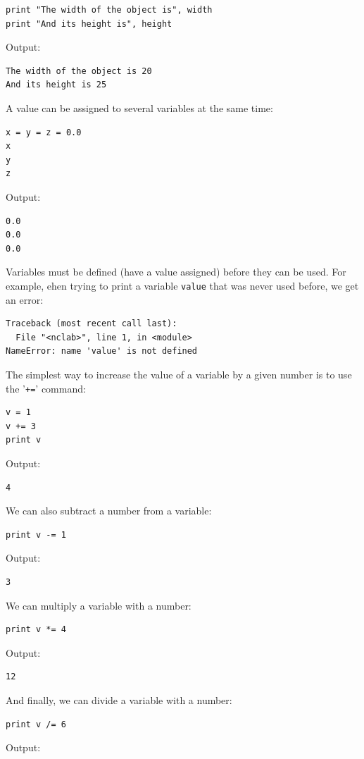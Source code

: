 \documentclass[article,A4,12pt]{llncs}
\begin{document}
\begin{verbatim}
print "The width of the object is", width
print "And its height is", height
\end{verbatim}
Output:

\begin{verbatim}
The width of the object is 20
And its height is 25
\end{verbatim}
A value can be assigned to several variables at the same time:

\begin{verbatim}
x = y = z = 0.0
x
y
z
\end{verbatim}
Output:

\begin{verbatim}
0.0
0.0
0.0
\end{verbatim}
Variables must be defined (have a value assigned) before they can be 
used. For example, ehen trying to print a variable {\tt value} that 
was never used before, we get an error:

\begin{verbatim}
Traceback (most recent call last):
  File "<nclab>", line 1, in <module>
NameError: name 'value' is not defined
\end{verbatim}
The simplest way to increase the value of a variable by a given number is to use the '{\tt +=}' 
command:

\begin{verbatim}
v = 1
v += 3
print v
\end{verbatim}
Output:

\begin{verbatim}
4
\end{verbatim}
We can also subtract a number from a variable:

\begin{verbatim}
print v -= 1
\end{verbatim}
Output:

\begin{verbatim}
3
\end{verbatim}
We can multiply a variable with a number:

\begin{verbatim}
print v *= 4
\end{verbatim}
Output:

\begin{verbatim}
12
\end{verbatim}
And finally, we can divide a variable with a number:

\begin{verbatim}
print v /= 6
\end{verbatim}
Output:
\end{document}
